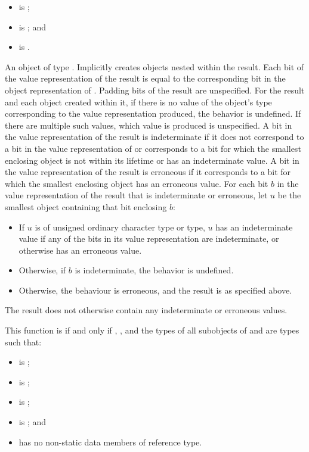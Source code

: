 \begin{itemdescr}
\pnum
\constraints
\begin{itemize}
\item {} is ;
\item {} is ; and
\item {} is .
\end{itemize}

\pnum
\returns
An object of type .
Implicitly creates objects nested within the result.
Each bit of the value representation of the result
is equal to the corresponding bit in the object representation
of . Padding bits of the result are unspecified.
For the result and each object created within it,
if there is no value of the object's type corresponding to the
value representation produced, the behavior is undefined.
If there are multiple such values, which value is produced is unspecified.
A bit in the value representation of the result is indeterminate if
it does not correspond to a bit in the value representation of  or
corresponds to a bit
for which the smallest enclosing object is not within its lifetime or
has an indeterminate value.
A bit in the value representation of the result is erroneous
if it corresponds to a bit
for which the smallest enclosing object has an erroneous value.
For each bit $b$ in the value representation of the result
that is indeterminate or erroneous,
let $u$ be the smallest object containing that bit enclosing $b$:
\begin{itemize}
\item
If $u$ is of unsigned ordinary character type or  type,
$u$ has an indeterminate value
if any of the bits in its value representation are indeterminate, or
otherwise has an erroneous value.
\item
Otherwise, if $b$ is indeterminate, the behavior is undefined.
\item
Otherwise, the behaviour is erroneous, and the result is as specified above.
\end{itemize}
The result does not otherwise contain any indeterminate or erroneous values.

\pnum
\remarks
This function is  if and only if
, , and the types of all subobjects
of  and  are types  such that:
\begin{itemize}
\item {} is ;
\item {} is ;
\item {} is ;
\item {} is ; and
\item {} has no non-static data members of reference type.
\end{itemize}
\end{itemdescr}

